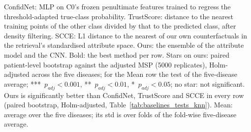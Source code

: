 \begin{table}[htbp]
\begin{threeparttable}
\begin{tabular}{ll|c|ccc|c}
\bottomrule
\end{tabular}
\begin{tablenotes}\footnotesize
\item ConfidNet: MLP on C0's frozen penultimate features trained to regress the threshold-adapted true-class probability. TrustScore: distance to the nearest training points of the other class divided by that to the predicted class, after density filtering. SCCE: L1 distance to the nearest of our own counterfactuals in the retrieval's standardised attribute space. Ours: the ensemble of the attribute model and the CNN. Bold: the best method per row. Stars on ours: paired patient-level bootstrap against the adjusted MSP (5000 replicates), Holm-adjusted across the five diseases; for the Mean row the test of the five-disease average; ***~$p_{adj} < 0.001$, **~$p_{adj} < 0.01$, *~$p_{adj} < 0.05$; no star: not significant. Ours is significantly better than ConfidNet, TrustScore and SCCE in every row (paired bootstrap, Holm-adjusted, Table~\ref{tab:baselines_tests_knn}). Mean: average over the five diseases; its std is over folds of the fold-wise five-disease average.
\end{tablenotes}
\end{threeparttable}
\end{table}
